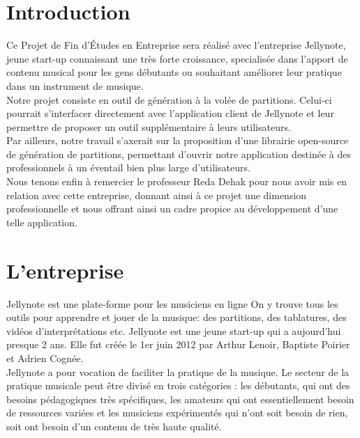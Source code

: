 \documentclass[12pt]{article}
\begin{document}



\newpage
\tableofcontents

\newpage
\clearpage

\section{Introduction}

Ce Projet de Fin d'Études en Entreprise sera réalisé avec l'entreprise Jellynote, jeune start-up connaissant une très forte croissance, specialisée dans l'apport de contenu musical pour les gens débutants ou souhaitant améliorer leur pratique dans un instrument de musique.\\

Notre projet consiste en outil de génération à la volée de partitions. Celui-ci pourrait s'interfacer directement avec l'application client de Jellynote et leur permettre de proposer un outil supplémentaire à leurs utilisateurs.\\

Par ailleurs, notre travail s'axerait sur la proposition d'une librairie open-source de génération de partitions, permettant d'ouvrir notre application destinée à des professionnels à un éventail bien plus large d'utilisateurs.\\

Nous tenons enfin à remercier le professeur Reda Dehak pour nous avoir mis en relation avec cette entreprise, donnant ainsi à ce projet une dimension professionnelle et nous offrant ainsi un cadre propice au développement d'une telle application.


\newpage
\section{L'entreprise}
Jellynote est une plate-forme pour les musiciens en ligne On y trouve tous les outils pour apprendre et jouer de la musique: des partitions, des tablatures, des vidéos d’interprétations etc. Jellynote est une jeune start-up qui a aujourd’hui presque 2 ans. Elle fut créée le 1er juin 2012 par Arthur Lenoir, Baptiste Poirier et Adrien Cognée.\\

Jellynote a pour vocation de faciliter la pratique de la musique. Le secteur de la pratique musicale peut être divisé en trois catégories : les débutants, qui ont des besoins pédagogiques très spécifiques, les amateurs qui ont essentiellement besoin de ressources variées et les musiciens expérimentés qui n’ont soit besoin de rien, soit ont besoin d’un contenu de très haute qualité.\\
\end{document}
